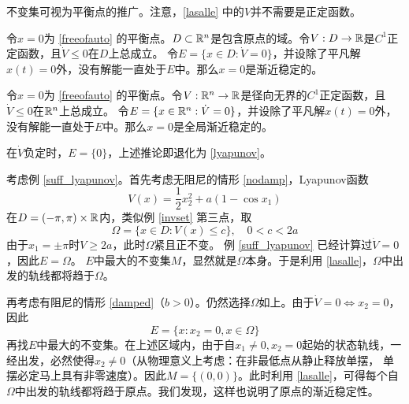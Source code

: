 \begin{note}
	不变集可视为平衡点的推广。注意，\ref{lasalle} 中的$V$并不需要是正定函数。
\end{note}
\begin{corollary}
	令$x=0$为 \eqref{freeofauto} 的平衡点。$D\subset\mathbb{R}{}^n$是包含原点的域。令$V:D\to\mathbb{R}{}$是$C^1$正定函数，且$\dot{V}\le 0$在$D$上总成立。
	令$E=\{x\in D:\dot{V}=0\}$，并设除了平凡解$x(t)=0$外，没有解能一直处于$E$中。那么$x=0$是渐近稳定的。
\end{corollary}
\begin{corollary}\label{lasallegas}
	令$x=0$为 \eqref{freeofauto} 的平衡点。令$V:\mathbb{R}{}^n\to\mathbb{R}{}$是径向无界的$C^1$正定函数，且$\dot{V}\le 0$在$\mathbb{R}{}^n$上总成立。
	令$E=\{x\in \mathbb{R}{}^n:\dot{V}=0\}$，并设除了平凡解$x(t)=0$外，没有解能一直处于$E$中。那么$x=0$是全局渐近稳定的。
\end{corollary}
\begin{note}
	在$\dot{V}$负定时，$E=\{0\}$，上述推论即退化为 \ref{lyapunov}。
\end{note}
\begin{example}[利用LaSalle定理判别单摆系统稳定性]
	考虑例 \ref{suff_lyapunov}。首先考虑无阻尼的情形 \eqref{nodamp}，Lyapunov函数\[V(x)=\frac{1}{2}x_2^2+a(1-\cos x_1)\]
	在$D=(-\pi,\pi)\times\mathbb{R}{}$内，类似例 \ref{invset} 第三点，取\[\Omega=\{x\in D:V(x)\le c\},\quad 0<c<2a\]由于$x_1=\pm\pi$时$V\ge2a$，此时$\Omega$紧且正不变。
	例 \ref{suff_lyapunov} 已经计算过$\dot{V}=0$，因此$E=\Omega$。
	$E$中最大的不变集$M$，显然就是$\Omega$本身。于是利用 \ref{lasalle}，$\Omega$中出发的轨线都将趋于$\Omega$。

	再考虑有阻尼的情形 \eqref{damped}（$b>0$）。仍然选择$\Omega$如上。由于$\dot{V}=0\iff x_2=0$，因此\[E=\{x:x_2=0,x\in\Omega\}\]
	再找$E$中最大的不变集。在上述区域内，由于自$x_1\ne 0,x_2=0$起始的状态轨线，一经出发，必然使得$x_2\ne 0$（从物理意义上考虑：在非最低点从静止释放单摆，
	单摆必定马上具有非零速度）。因此$M=\{(0,0)\}$。此时利用 \ref{lasalle}，可得每个自$\Omega$中出发的轨线都将趋于原点。我们发现，这样也说明了原点的渐近稳定性。
\end{example}
